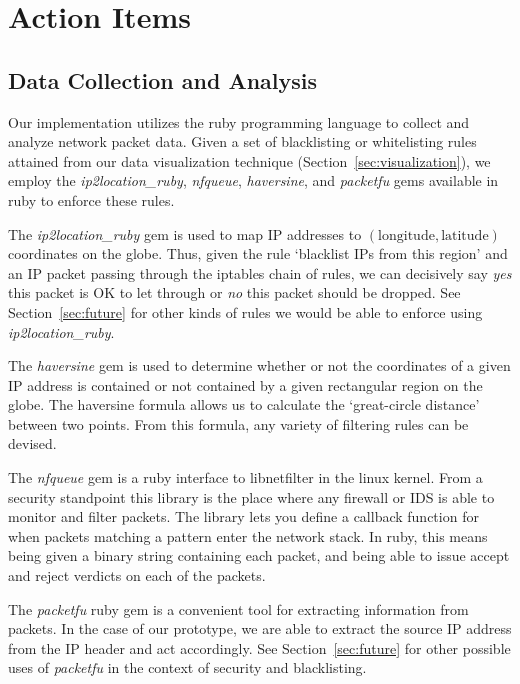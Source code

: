 \documentclass[aps,preprint,amsmath,amssymb]{revtex4}
\begin{document}
\section{Action Items}
\subsection{Data Collection and Analysis}
\label{sec:collection}

Our implementation utilizes the ruby programming language to collect and analyze network
packet data. Given a set of blacklisting or whitelisting rules attained from our data
visualization technique (Section~\ref{sec:visualization}), we employ the \emph{ip2location\_ruby},
\emph{nfqueue}, \emph{haversine}, and \emph{packetfu} gems available in ruby to enforce
these rules.

The \emph{ip2location\_ruby} gem is used to map IP addresses to
$(\text{longitude},\text{latitude})$ coordinates on the globe. Thus, given
the rule `blacklist IPs from this region' and an IP packet passing through
the iptables chain of rules, we can decisively say \emph{yes} this packet
is OK to let through or \emph{no} this packet should be dropped. See
Section~\ref{sec:future} for other kinds of rules we would be able to
enforce using \emph{ip2location\_ruby}.

The \emph{haversine} gem is used to determine whether or not the coordinates of
a given IP address is contained or not contained by a given rectangular region on
the globe. The haversine formula allows us to calculate the `great-circle distance'
between two points. From this formula, any variety of filtering rules can be devised.

The \emph{nfqueue} gem is a ruby interface to libnetfilter in the linux kernel.
From a security standpoint this
library is the place where any firewall or IDS is able to monitor and filter packets.
The library lets you define a callback function for when packets matching a pattern
enter the network stack. In ruby, this means being given a binary string containing
each packet, and being able to issue accept and reject verdicts on each of the packets.

The \emph{packetfu} ruby gem is a convenient tool for extracting information from packets.
In the case of our prototype, we are able to extract the source IP address from the IP
header and act accordingly. See Section~\ref{sec:future} for other possible uses of
\emph{packetfu} in the context of security and blacklisting.
\end{document}
